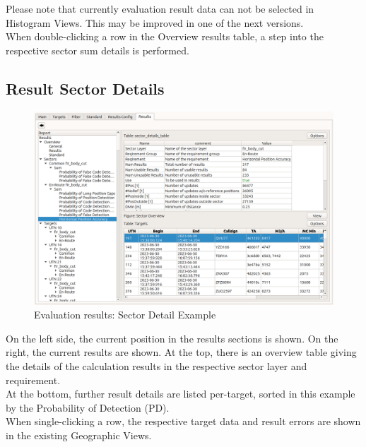 Please note that currently evaluation result data can not be selected in Histogram Views. This may be improved in one of the next versions. \\

When double-clicking a row in the Overview results table, a step into the respective sector sum details is performed.

\subsection{Result Sector Details}

\begin{figure}[H]
  \hspace*{-2cm}
    \includegraphics[width=18cm,frame]{figures/eval_results_sec_det_example.png}
  \caption{Evaluation results: Sector Detail Example}
\end{figure}

On the left side, the current position in the results sections is shown. On the right, the current results are shown. At the top, there is an overview table giving the details of the calculation results in the respective sector layer and requirement. \\

At the bottom, further result details are listed per-target, sorted in this example by the Probability of Detection (PD). \\

When single-clicking a row, the respective target data and result errors are shown in the existing Geographic Views.


